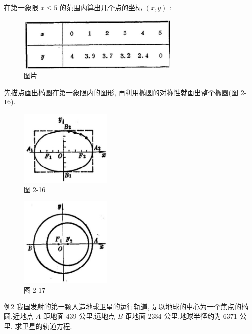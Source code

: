 \documentclass[lang=cn,newtx,10.5pt,scheme=chinese]{elegantbook}
\begin{document}
在第一象限 \(x \leq 5\) 的范围内算出几个点的坐标 \(\left( {x,y}\right)\) :

\begin{figure}[h]
  \centering
  \includegraphics[max width=0.7\textwidth]{images/01912cc2-ffb6-728e-9ae7-b113ff05c64b_92_362735.jpg}
  \caption{图片}
\end{figure}

先描点画出椭圆在第一象限内的图形, 再利用椭圆的对称性就画出整个椭圆(图 2-16).

\begin{figure}[h]
  \centering
  \includegraphics[max width=0.4\textwidth]{images/01912cc2-ffb6-728e-9ae7-b113ff05c64b_92_523518.jpg}
  \caption{图 2-16}
\end{figure}



\begin{figure}[h]
  \centering
  \includegraphics[max width=0.4\textwidth]{images/01912cc2-ffb6-728e-9ae7-b113ff05c64b_92_511935.jpg}
  \caption{图 2-17}
\end{figure}



例2 我国发射的第一颗人造地球卫星的运行轨道, 是以地球的中心为一个焦点的椭圆,近地点 \(A\) 距地面 439 公里,远地点 \(B\) 距地面 2384 公里,地球半径约为 6371 公里. 求卫星的轨道方程.
\end{document}
